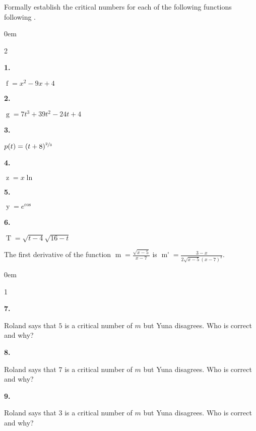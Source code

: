 \documentclass[12pt,]{book}
\theoremstyle{plain}
\theoremstyle{definition}
\numberwithin{equation}{section}
\newenvironment{exercisegroup}%
{\medskip\noindent}%
{\par\bigskip}%
\newlength{\exercisegroupindent}%
\newlength{\exercisegroupitemwidth}%
\newenvironment{exercisegrouplist}%
{\vspace{-\partopsep}%
\begin{adjustwidth}{\exercisegroupindent}{0em}}%
{\end{adjustwidth}%
\vspace{-\partopsep}%
\vspace{\baselineskip}}%
\newenvironment{exercisegroupbycol}[1]%
{\begin{exercisegrouplist}%
\vspace{-\multicolsep}%
\begin{multicols}{#1}%
\setlength{\parindent}{0em}%
\setlength{\exercisegroupitemwidth}{\linewidth}}%
{\end{multicols}%
\vspace{-\multicolsep}%
\end{exercisegrouplist}}%
\newenvironment{exercisegroupitem}[1]%
{\begin{minipage}[t]{\exercisegroupitemwidth}
\vspace{0pt}%
{\bfseries#1}%
\rule{0pt}{\baselineskip}}{\strut%
\end{minipage}%
\hspace{\columnsep}}%
\providecommand\phantomsection{}
\newcommand{\fe}[2]{\mathop{{#1}{\left(#2\right)}}}
\newcommand{\fd}[1]{#1'}
\begin{document}
\begin{exercisegroup}%
Formally establish the critical numbers for each of the following functions following .%
\par
\begin{exercisegroupbycol}{2}%
\begin{exercisegroupitem}{1. }\phantomsection\hypertarget{exercise-12}{\null}
\(\fe{f}{x}=x^2-9x+4\)%
\end{exercisegroupitem}%
\par%
\begin{exercisegroupitem}{2. }\phantomsection\hypertarget{exercise-13}{\null}
\(\fe{g}{t}=7t^3+39t^2-24t+4\)%
\end{exercisegroupitem}%
\par%
\begin{exercisegroupitem}{3. }\phantomsection\hypertarget{exercise-14}{\null}
\(\fe{p}{t}=(t+8)^{\sfrac{2}{3}}\)%
\end{exercisegroupitem}%
\par%
\begin{exercisegroupitem}{4. }\phantomsection\hypertarget{exercise-15}{\null}
\(\fe{z}{x}=x\fe{\ln}{x}\)%
\end{exercisegroupitem}%
\par%
\begin{exercisegroupitem}{5. }\phantomsection\hypertarget{exercise-16}{\null}
\(\fe{y}{\theta}=e^{\fe{\cos}{\theta}}\)%
\end{exercisegroupitem}%
\par%
\begin{exercisegroupitem}{6. }\phantomsection\hypertarget{exercise-17}{\null}
\(\fe{T}{t}=\sqrt{t-4}\sqrt{16-t}\)%
\end{exercisegroupitem}%
\par%
\end{exercisegroupbycol}%
\end{exercisegroup}%
\begin{exercisegroup}%
The first derivative of the function \(\fe{m}{x}=\frac{\sqrt{x-5}}{x-7}\) is \(\fe{\fd{m}}{x}=\frac{3-x}{2\sqrt{x-5}(x-7)^2}\).%
\par
\begin{exercisegroupbycol}{1}%
\begin{exercisegroupitem}{7. }\phantomsection\hypertarget{exercise-18}{\null}
Roland says that \(5\) is a critical number of \(m\) but Yuna disagrees.  Who is correct and why?%
\end{exercisegroupitem}%
\par%
\begin{exercisegroupitem}{8. }\phantomsection\hypertarget{exercise-19}{\null}
Roland says that \(7\) is a critical number of \(m\) but Yuna disagrees.  Who is correct and why?%
\end{exercisegroupitem}%
\par%
\begin{exercisegroupitem}{9. }\phantomsection\hypertarget{exercise-20}{\null}
Roland says that \(3\) is a critical number of \(m\) but Yuna disagrees.  Who is correct and why?%
\end{exercisegroupitem}%
\par%
\end{exercisegroupbycol}%
\end{exercisegroup}%
\end{document}
